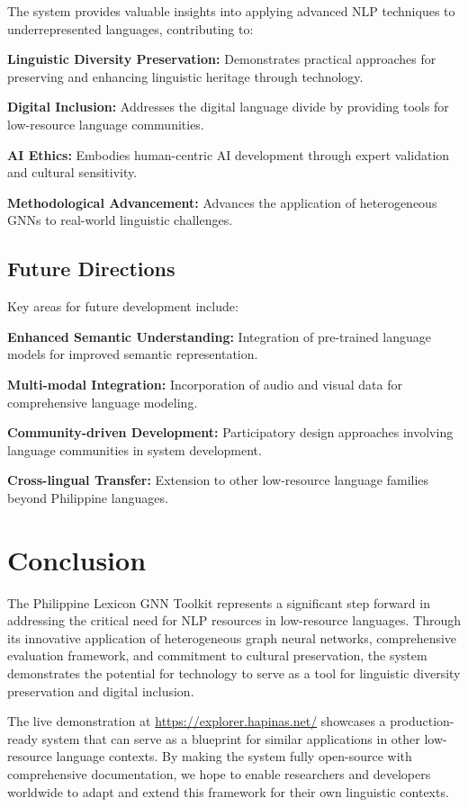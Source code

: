 \documentclass[11pt]{article}
\newcommand{\url}[1]{\href{#1}{#1}}
\begin{document}
The system provides valuable insights into applying advanced NLP techniques to underrepresented languages, contributing to:

\textbf{Linguistic Diversity Preservation:} Demonstrates practical approaches for preserving and enhancing linguistic heritage through technology.

\textbf{Digital Inclusion:} Addresses the digital language divide by providing tools for low-resource language communities.

\textbf{AI Ethics:} Embodies human-centric AI development through expert validation and cultural sensitivity.

\textbf{Methodological Advancement:} Advances the application of heterogeneous GNNs to real-world linguistic challenges.

\subsection{Future Directions}

Key areas for future development include:

\textbf{Enhanced Semantic Understanding:} Integration of pre-trained language models for improved semantic representation.

\textbf{Multi-modal Integration:} Incorporation of audio and visual data for comprehensive language modeling.

\textbf{Community-driven Development:} Participatory design approaches involving language communities in system development.

\textbf{Cross-lingual Transfer:} Extension to other low-resource language families beyond Philippine languages.

\section{Conclusion}

The Philippine Lexicon GNN Toolkit represents a significant step forward in addressing the critical need for NLP resources in low-resource languages. Through its innovative application of heterogeneous graph neural networks, comprehensive evaluation framework, and commitment to cultural preservation, the system demonstrates the potential for technology to serve as a tool for linguistic diversity preservation and digital inclusion.

The live demonstration at \url{https://explorer.hapinas.net/} showcases a production-ready system that can serve as a blueprint for similar applications in other low-resource language contexts. By making the system fully open-source with comprehensive documentation, we hope to enable researchers and developers worldwide to adapt and extend this framework for their own linguistic contexts.
\end{document}
